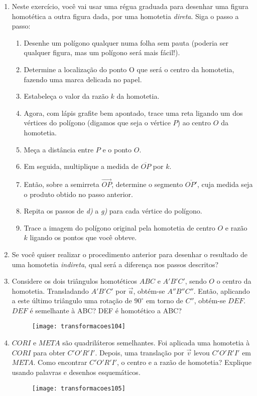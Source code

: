 \begin{enumerate}
\item   Neste exercício, você vai usar uma régua graduada para desenhar uma figura homotética a outra figura dada, por uma homotetia \textit{direta}. Siga o passo a passo: 
\begin{enumerate}
\item Desenhe um polígono qualquer numa folha sem pauta (poderia ser qualquer figura, mas um polígono será mais fácil!).
\item Determine a localização do ponto O que será o centro da homotetia, fazendo uma marca delicada no papel. 
\item Estabeleça o valor da razão $k$ da homotetia. 
\item Agora, com lápis grafite bem apontado, trace uma reta ligando um dos vértices do polígono (digamos que seja o vértice $P$) ao centro $O$ da homotetia. 
\item Meça a distância entre $P$ e o ponto $O$. 
\item Em seguida, multiplique a medida de $\overline{OP}$ por $k$. 
\item Então, sobre a semirreta $\overrightarrow{OP}$, determine o segmento $\overline{OP'}$, cuja medida seja o produto obtido no passo anterior.
\item Repita os passos de \textit{d)} a \textit{g)} para cada vértice do polígono. 
\item Trace a imagem do polígono original pela homotetia de centro $O$ e razão $k$ ligando os pontos que você obteve.
\end{enumerate}

\item Se você quiser realizar o procedimento anterior para desenhar o resultado de uma homotetia \textit{indireta}, qual será a diferença nos passos descritos? 

\item Considere os dois triângulos homotéticos $ABC$ e $A'B'C'$, sendo $O$ o centro da homotetia. Transladando $A'B'C'$ por $\overrightarrow{u}$, obtém-se $A''B''C''$. Então, aplicando a este último triângulo uma rotação de $90^{\circ}$ em torno de $C''$, obtém-se $DEF$. $DEF$ é semelhante à ABC? DEF é homotético a ABC?

\begin{figure}[H]
\centering

\texttt{[image: transformacoes104]}
\end{figure}

\item $CORI$ e $META$ são quadriláteros semelhantes. Foi aplicada uma homotetia à $CORI$ para obter $C'O'R'I'$. Depois, uma translação por $\overrightarrow{v}$ levou $C'O'R'I'$ em $META$. Como encontrar $C'O'R'I'$, o centro e a razão de homotetia? Explique usando palavras e desenhos esquemáticos. 

\begin{figure}[H]
\centering

\texttt{[image: transformacoes105]}
\end{figure}
\end{enumerate}

